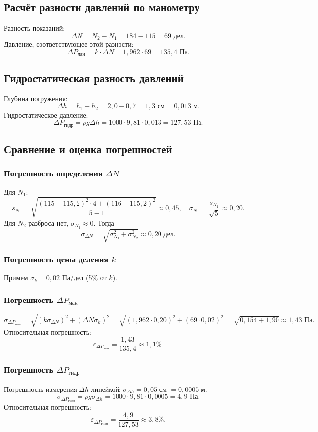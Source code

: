 \documentclass[a4paper, 12pt]{article}
\begin{document}
\subsection*{Расчёт разности давлений по манометру}
Разность показаний:
\[
\Delta N = N_2 - N_1 = 184 - 115 = 69 \text{ дел.}
\]
Давление, соответствующее этой разности:
\[
\Delta P_{\text{ман}} = k \cdot \Delta N = 1,962 \cdot 69 = 135,4 \text{ Па}.
\]

\subsection*{Гидростатическая разность давлений}
Глубина погружения:
\[
\Delta h = h_1 - h_2 = 2,0 - 0,7 = 1,3 \text{ см} = 0,013 \text{ м}.
\]
Гидростатическое давление:
\[
\Delta P_{\text{гидр}} = \rho g \Delta h = 1000 \cdot 9,81 \cdot 0,013 = 127,53 \text{ Па}.
\]

\subsection*{Сравнение и оценка погрешностей}

\subsubsection*{Погрешность определения \(\Delta N\)}
Для \(N_1\):
\[
s_{N_1} = \sqrt{\frac{(115-115,2)^2\cdot4 + (116-115,2)^2}{5-1}} \approx 0,45,
\quad \sigma_{N_1} = \frac{s_{N_1}}{\sqrt{5}} \approx 0,20.
\]
Для \(N_2\) разброса нет, \(\sigma_{N_2} \approx 0\).
Тогда
\[
\sigma_{\Delta N} = \sqrt{\sigma_{N_1}^2 + \sigma_{N_2}^2} \approx 0,20 \text{ дел.}
\]

\subsubsection*{Погрешность цены деления \(k\)}
Примем \(\sigma_k = 0,02\) Па/дел (5\% от \(k\)).

\subsubsection*{Погрешность \(\Delta P_{\text{ман}}\)}
\[
\sigma_{\Delta P_{\text{ман}}} = \sqrt{(k \sigma_{\Delta N})^2 + (\Delta N \sigma_k)^2}
= \sqrt{(1,962 \cdot 0,20)^2 + (69 \cdot 0,02)^2}
= \sqrt{0,154 + 1,90} \approx 1,43 \text{ Па}.
\]
Относительная погрешность:
\[
\varepsilon_{\Delta P_{\text{ман}}} = \frac{1,43}{135,4} \approx 1,1\%.
\]

\subsubsection*{Погрешность \(\Delta P_{\text{гидр}}\)}
Погрешность измерения \(\Delta h\) линейкой: \(\sigma_{\Delta h} = 0,05\) см \(= 0,0005\) м.
\[
\sigma_{\Delta P_{\text{гидр}}} = \rho g \sigma_{\Delta h} = 1000 \cdot 9,81 \cdot 0,0005 = 4,9 \text{ Па}.
\]
Относительная погрешность:
\[
\varepsilon_{\Delta P_{\text{гидр}}} = \frac{4,9}{127,53} \approx 3,8\%.
\]
\end{document}
